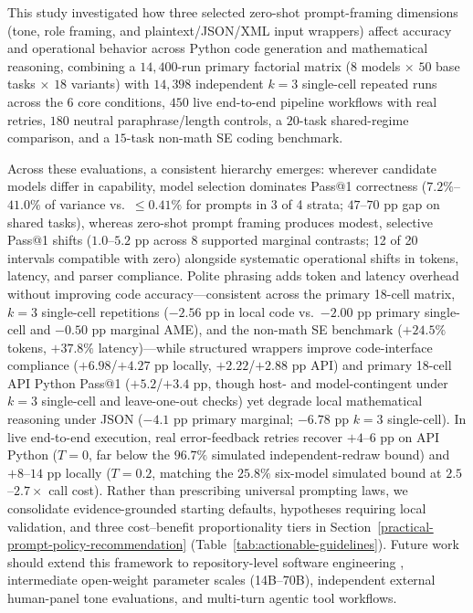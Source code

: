 \documentclass[a4paper,fleqn]{cas-sc}
\begin{document}
This study investigated how three selected zero-shot prompt-framing dimensions (tone, role framing, and plaintext/JSON/XML input wrappers) affect accuracy and operational behavior across Python code generation and mathematical reasoning, combining a $14{,}400$-run primary factorial matrix ($8$ models $\times$ $50$ base tasks $\times$ $18$ variants) with $14{,}398$ independent $k = 3$ single-cell repeated runs across the $6$ core conditions, $450$ live end-to-end pipeline workflows with real retries, $180$ neutral paraphrase/length controls, a $20$-task shared-regime comparison, and a $15$-task non-math SE coding benchmark.

Across these evaluations, a consistent hierarchy emerges: wherever candidate models differ in capability, model selection dominates Pass@1 correctness ($7.2\%$--$41.0\%$ of variance vs.\ $\le 0.41\%$ for prompts in 3 of 4 strata; $47$--$70$ pp gap on shared tasks), whereas zero-shot prompt framing produces modest, selective Pass@1 shifts ($1.0$--$5.2$ pp across 8 supported marginal contrasts; 12 of 20 intervals compatible with zero) alongside systematic operational shifts in tokens, latency, and parser compliance. Polite phrasing adds token and latency overhead without improving code accuracy—consistent across the primary 18-cell matrix, $k = 3$ single-cell repetitions ($-2.56$ pp in local code vs.\ $-2.00$ pp primary single-cell and $-0.50$ pp marginal AME), and the non-math SE benchmark ($+24.5\%$ tokens, $+37.8\%$ latency)—while structured wrappers improve code-interface compliance ($+6.98$/$+4.27$ pp locally, $+2.22$/$+2.88$ pp API) and primary 18-cell API Python Pass@1 ($+5.2$/$+3.4$ pp, though host- and model-contingent under $k = 3$ single-cell and leave-one-out checks) yet degrade local mathematical reasoning under JSON ($-4.1$ pp primary marginal; $-6.78$ pp $k = 3$ single-cell). In live end-to-end execution, real error-feedback retries recover $+4$--$6$ pp on API Python ($T = 0$, far below the $96.7\%$ simulated independent-redraw bound) and $+8$--$14$ pp locally ($T = 0.2$, matching the $25.8\%$ six-model simulated bound at $2.5$--$2.7\times$ call cost). Rather than prescribing universal prompting laws, we consolidate evidence-grounded starting defaults, hypotheses requiring local validation, and three cost--benefit proportionality tiers in Section~\ref{practical-prompt-policy-recommendation} (Table~\ref{tab:actionable-guidelines}). Future work should extend this framework to repository-level software engineering \citep{jimenez2024swebench}, intermediate open-weight parameter scales (14B--70B), independent external human-panel tone evaluations, and multi-turn agentic tool workflows.
\end{document}
